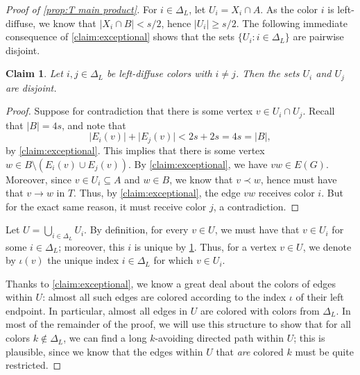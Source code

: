 \documentclass[11pt,reqno]{amsart}
\newtheorem{claim}[theorem]{Claim}
\theoremstyle{definition}
\newcommand\ab[1]{\lvert#1\rvert}
\newcommand\1{\mathbf{1}}
\let\geq\geqslant
\begin{document}
\begin{proof}[Proof of \cref{prop:T main product}]
    For $i \in \Delta_L$, let $U_i = X_i \cap A$. As the color $i$ is left-diffuse, we know that $\ab{X_i \cap B}<s/2$, hence $\ab{U_i}\geq s/2$. 
    The following immediate consequence of \cref{claim:exceptional} shows that the sets $\{U_i : i \in \Delta_L\}$ are pairwise disjoint.
    \begin{claim}\label{claim:T Ui disjoint}
        Let $i,j \in \Delta_L$ be left-diffuse colors with $i \neq j$. Then the sets $U_i$ and $U_j$ are disjoint.
    \end{claim}
    \begin{proof}
        Suppose for contradiction that there is some vertex $v \in U_i \cap U_j$. Recall that $\ab B=4s$, and note that
        \[
            \ab{E_i(v)} + \ab{E_j(v)} < 2s+2s = 4s = \ab B,
        \]
        by \cref{claim:exceptional}.
        This implies that there is some vertex $w \in B \setminus (E_i(v) \cup E_j(v))$. By \cref{claim:exceptional}, we have $vw \in E(G)$. Moreover, since $v \in U_i \subseteq A$ and $w \in B$, we know that $v \prec w$, hence must have that $v\to w$ in $T$. Thus, by \cref{claim:exceptional}, the edge $vw$ receives color $i$. 
        But for the exact same reason, it must receive color $j$, a contradiction.
    \end{proof}
    Let $U = \bigcup_{i \in \Delta_L}U_i$. 
    By definition, for every $v \in U$, we must have that $v \in U_i$ for some $i\in \Delta_L$; moreover, this $i$ is unique by \cref{claim:T Ui disjoint}. Thus, for a vertex $v \in U$, we denote by $\iota(v)$ the unique index $i\in \Delta_L$ for which $v \in U_{i}$.
    
    Thanks to \cref{claim:exceptional}, we know a great deal about the colors of edges within $U$: almost all such edges are colored according to the index $\iota$ of their left endpoint. In particular, almost all edges in $U$ are colored with colors from $\Delta_L$. 
    In most of the remainder of the proof, we will use this structure to show that for all colors $k \notin \Delta_L$, we can find a long $k$-avoiding directed path within $U$; this is plausible, since we know that the edges within $U$ that \emph{are} colored $k$ must be quite restricted.


\end{proof}
\end{document}
